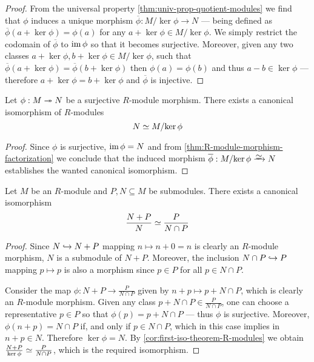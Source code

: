 \begin{proof}
    From the universal property \cref{thm:univ-prop-quotient-modules} we find that
    \(\phi\) induces a unique morphism \(\overline{\phi}: M/{\ker \phi} \to N\) ---
    being defined as \(\overline{\phi}(a + \ker \phi) = \phi(a)\) for any
    \(a + \ker \phi \in M/{\ker \phi}\). We simply restrict the codomain of
    \(\overline{\phi}\) to \(\operatorname{im} \phi\) so that it becomes surjective. Moreover,
    given any two classes \(a + \ker \phi, b + \ker \phi \in M/{\ker \phi}\), such
    that \(\overline{\phi}(a + \ker \phi) = \overline{\phi}(b + \ker \phi)\) then
    \(\phi(a) = \phi(b)\) and thus \(a - b \in \ker \phi\) --- therefore \(a + \ker
    \phi = b + \ker \phi\) and \(\overline{\phi}\) is injective.
\end{proof}

\begin{corollary}
    \label{cor:first-iso-theorem-R-modules}
    Let \(\phi: M \twoheadrightarrow N\) be a surjective \(R\)-module morphism. There exists a
    canonical isomorphism of \(R\)-modules
    \[
        N \simeq M/{\ker \phi}
    \]
\end{corollary}

\begin{proof}
    Since \(\phi\) is surjective, \(\operatorname{im} \phi = N\) and from
    \cref{thm:R-module-morphism-factorization} we conclude that the induced morphism
    \(\overline{\phi}: M/{\ker \phi} \isoto N\) establishes the wanted canonical
    isomorphism.
\end{proof}

\begin{proposition}
    \label{prop:second-iso-R-mod}
    Let \(M\) be an \(R\)-module and \(P, N \subseteq M\) be submodules. There
    exists a canonical isomorphism
    \[
        \frac{N + P}{N} \simeq \frac{P}{N \cap P}
    \]
\end{proposition}

\begin{proof}
    Since \(N \hookrightarrow N + P\) mapping \(n \mapsto n + 0 = n\) is clearly an
    \(R\)-module morphism, \(N\) is a submodule of \(N + P\). Moreover, the
    inclusion \(N \cap P \hookrightarrow P\) mapping \(p \mapsto p\) is also a morphism since
    \(p \in P\) for all \(p \in N \cap P\).

    Consider the map \(\phi: N + P \to \frac{P}{N \cap P}\) given by
    \(n + p \mapsto p + N \cap P\), which is clearly an \(R\)-module morphism. Given
    any class \(p + N \cap P \in \frac{P}{N \cap P}\), one can choose a
    representative \(p \in P\) so that \(\phi(p) = p + N \cap P\) --- thus \(\phi\)
    is surjective. Moreover, \(\phi(n + p) = N \cap P\) if, and only if
    \(p \in N \cap P\), which in this case implies in \(n + p \in N\). Therefore
    \(\ker \phi = N\). By \cref{cor:first-iso-theorem-R-modules} we obtain
    \(\frac{N + P}{\ker \phi} \simeq \frac{P}{N \cap P}\), which is the required
    isomorphism.
\end{proof}

